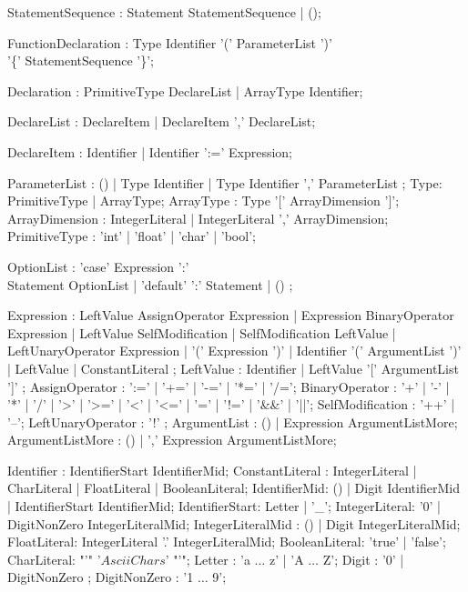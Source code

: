 \documentclass[a4paper, 11.5pt]{article}
\begin{document}
\begin{multicols}{2}

  \begin{rail}
    StatementSequence : Statement StatementSequence | ();

    FunctionDeclaration : Type Identifier '(' ParameterList ')' \\
                        '\{' StatementSequence '\}';
    
    Declaration : PrimitiveType DeclareList | ArrayType Identifier;

    DeclareList : DeclareItem | DeclareItem ',' DeclareList;

    DeclareItem : Identifier | Identifier ':=' Expression;

    ParameterList : () | Type Identifier | Type Identifier ',' ParameterList ;
    Type: PrimitiveType | ArrayType;
    ArrayType : Type '[' ArrayDimension ']';
    ArrayDimension : IntegerLiteral | IntegerLiteral ',' ArrayDimension;
    PrimitiveType : 'int' | 'float' | 'char' | 'bool';

    OptionList : 'case' Expression ':' \\
                  Statement OptionList
              | 'default' ':' Statement
              | ()
              ;
  \end{rail}
  
  
    \begin{rail}      
      Expression : LeftValue AssignOperator Expression
                  | Expression BinaryOperator Expression
                  | LeftValue SelfModification
                  | SelfModification LeftValue
                  | LeftUnaryOperator Expression
                  | '(' Expression ')'
                  | Identifier '(' ArgumentList ')'
                  | LeftValue
                  | ConstantLiteral
                  ;
      LeftValue : Identifier
                | LeftValue '[' ArgumentList ']'
                ;
      AssignOperator : ':=' | '+=' | '-=' | '*=' | '/=';
      BinaryOperator : '+' | '-' | '*' | '/' 
                      | '>' | '>=' | '<' | '<=' | '=' | '!=' 
                      | '\&\&' | '||';
      SelfModification : '++' | '--';
      LeftUnaryOperator : '!' ;
      ArgumentList : () | Expression ArgumentListMore;
      ArgumentListMore : () | ',' Expression ArgumentListMore;

    \end{rail}

    \begin{rail}
      Identifier : IdentifierStart IdentifierMid;
      ConstantLiteral : IntegerLiteral | CharLiteral | FloatLiteral | BooleanLiteral;
      IdentifierMid: () | Digit IdentifierMid | IdentifierStart IdentifierMid;
      IdentifierStart: Letter | '\_';
      IntegerLiteral: '0' | DigitNonZero IntegerLiteralMid;
      IntegerLiteralMid : () | Digit IntegerLiteralMid;
      FloatLiteral: IntegerLiteral '.' IntegerLiteralMid;
      BooleanLiteral: 'true' | 'false';
      CharLiteral: "'" '$Ascii Chars$' "'";
      Letter : 'a $\ldots$ z' | 'A $\ldots$ Z';
      Digit : '0' | DigitNonZero ;
      DigitNonZero : '1 $\ldots$ 9';
    \end{rail}

  \end{multicols}
\end{document}
